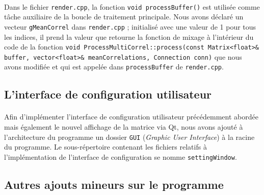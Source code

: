 \paragraph{}
Dans le fichier \verb!render.cpp!, la fonction
\verb!void processBuffer()! est utilisée comme tâche auxiliaire de la
boucle de traitement principale. Nous avons déclaré un vecteur
\verb!gMeanCorrel! dans \verb!render.cpp! ; initialisé avec une valeur
de 1 pour tous les indices, il prend la valeur que retourne la
fonction de mixage à l'intérieur du code de la fonction
\verb!void ProcessMultiCorrel::process(const Matrix<float>& buffer, vector<float>& meanCorrelations, Connection conn)!
que nous avons modifiée et qui est appelée dans \verb!processBuffer!
de \verb!render.cpp!.

\subsection{L'interface de configuration utilisateur}
\paragraph{}
Afin d'implémenter l'interface de configuration utilisateur précédemment abordée mais également le nouvel affichage de la matrice via Qt, nous avons ajouté à l'architecture du programme un dossier \verb!GUI! (\textit{Graphic User Interface}) à la racine du programme. Le sous-répertoire contenant les fichiers relatifs à l'implémentation de l'interface de configuration se nomme \verb!settingWindow!.
\paragraph{}

\subsection{Autres ajouts mineurs sur le programme}
